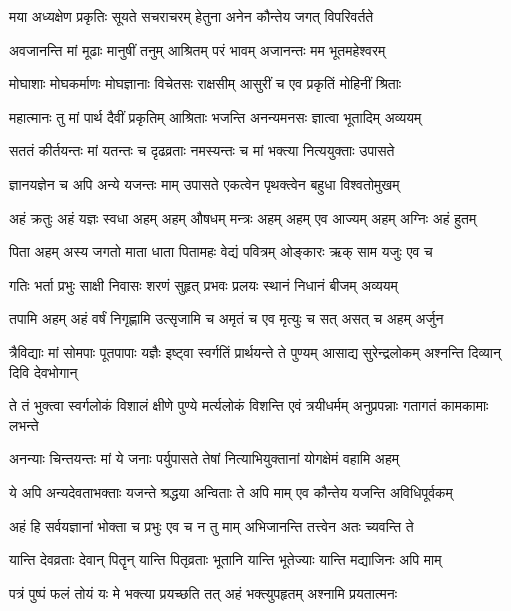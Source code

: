 \twolineshloka
{मया अध्यक्षेण प्रकृतिः सूयते सचराचरम्}
{हेतुना अनेन कौन्तेय जगत् विपरिवर्तते}%

\twolineshloka
{अवजानन्ति मां मूढाः मानुषीं तनुम् आश्रितम्}
{परं भावम् अजानन्तः मम भूतमहेश्वरम्}%

\twolineshloka
{मोघाशाः मोघकर्माणः मोघज्ञानाः विचेतसः}
{राक्षसीम् आसुरीं च एव प्रकृतिं मोहिनीं श्रिताः}%

\twolineshloka
{महात्मानः तु मां पार्थ दैवीं प्रकृतिम् आश्रिताः}
{भजन्ति अनन्यमनसः ज्ञात्वा भूतादिम् अव्ययम्}%

\twolineshloka
{सततं कीर्तयन्तः मां यतन्तः च दृढव्रताः}
{नमस्यन्तः च मां भक्त्या नित्ययुक्ताः उपासते}%

\twolineshloka
{ज्ञानयज्ञेन च अपि अन्ये यजन्तः माम् उपासते}
{एकत्वेन पृथक्त्वेन बहुधा विश्वतोमुखम्}%

\twolineshloka
{अहं क्रतुः अहं यज्ञः स्वधा अहम् अहम् औषधम्}
{मन्त्रः अहम् अहम् एव आज्यम् अहम् अग्निः अहं हुतम्}%

\twolineshloka
{पिता अहम् अस्य जगतो माता धाता पितामहः}
{वेद्यं पवित्रम् ओङ्कारः ऋक् साम यजुः एव च}%

\twolineshloka
{गतिः भर्ता प्रभुः साक्षी निवासः शरणं सुहृत्}
{प्रभवः प्रलयः स्थानं निधानं बीजम् अव्ययम्}%

\twolineshloka
{तपामि अहम् अहं वर्षं निगृह्णामि उत्सृजामि च}
{अमृतं च एव मृत्युः च सत् असत् च अहम् अर्जुन}%

\fourlineindentedshloka
{त्रैविद्याः मां सोमपाः पूतपापाः}
{यज्ञैः इष्ट्वा स्वर्गतिं प्रार्थयन्ते}
{ते पुण्यम् आसाद्य सुरेन्द्रलोकम्}
{अश्नन्ति दिव्यान् दिवि देवभोगान्}%

\fourlineindentedshloka
{ते तं भुक्त्वा स्वर्गलोकं विशालं}
{क्षीणे पुण्ये मर्त्यलोकं विशन्ति}
{एवं त्रयीधर्मम् अनुप्रपन्नाः}
{गतागतं कामकामाः लभन्ते}%

\twolineshloka
{अनन्याः चिन्तयन्तः मां ये जनाः पर्युपासते}
{तेषां नित्याभियुक्तानां योगक्षेमं वहामि अहम्}%

\twolineshloka
{ये अपि अन्यदेवताभक्ताः यजन्ते श्रद्धया अन्विताः}
{ते अपि माम् एव कौन्तेय यजन्ति अविधिपूर्वकम्}%

\twolineshloka
{अहं हि सर्वयज्ञानां भोक्ता च प्रभुः एव च}
{न तु माम् अभिजानन्ति तत्त्वेन अतः च्यवन्ति ते}%

\twolineshloka
{यान्ति देवव्रताः देवान् पितॄन् यान्ति पितृव्रताः}
{भूतानि यान्ति भूतेज्याः यान्ति मद्याजिनः अपि माम्}%

\twolineshloka
{पत्रं पुष्पं फलं तोयं यः मे भक्त्या प्रयच्छति}
{तत् अहं भक्त्युपहृतम् अश्नामि प्रयतात्मनः}%

